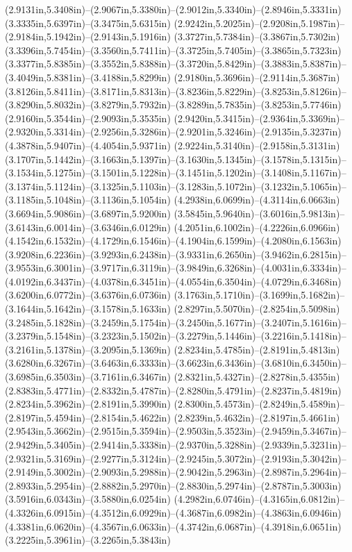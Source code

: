 (2.9131in,5.3408in)--(2.9067in,5.3380in)--(2.9012in,5.3340in)--(2.8946in,5.3331in) (3.3335in,5.6397in)--(3.3475in,5.6315in) (2.9242in,5.2025in)--(2.9208in,5.1987in)--(2.9184in,5.1942in)--(2.9143in,5.1916in) (3.3727in,5.7384in)--(3.3867in,5.7302in) (3.3396in,5.7454in)--(3.3560in,5.7411in)--(3.3725in,5.7405in)--(3.3865in,5.7323in) (3.3377in,5.8385in)--(3.3552in,5.8388in)--(3.3720in,5.8429in)--(3.3883in,5.8387in)--(3.4049in,5.8381in)--(3.4188in,5.8299in) (2.9180in,5.3696in)--(2.9114in,5.3687in) (3.8126in,5.8411in)--(3.8171in,5.8313in)--(3.8236in,5.8229in)--(3.8253in,5.8126in)--(3.8290in,5.8032in)--(3.8279in,5.7932in)--(3.8289in,5.7835in)--(3.8253in,5.7746in) (2.9160in,5.3544in)--(2.9093in,5.3535in) (2.9420in,5.3415in)--(2.9364in,5.3369in)--(2.9320in,5.3314in)--(2.9256in,5.3286in)--(2.9201in,5.3246in)--(2.9135in,5.3237in) (4.3878in,5.9407in)--(4.4054in,5.9371in) (2.9224in,5.3140in)--(2.9158in,5.3131in) (3.1707in,5.1442in)--(3.1663in,5.1397in)--(3.1630in,5.1345in)--(3.1578in,5.1315in)--(3.1534in,5.1275in)--(3.1501in,5.1228in)--(3.1451in,5.1202in)--(3.1408in,5.1167in)--(3.1374in,5.1124in)--(3.1325in,5.1103in)--(3.1283in,5.1072in)--(3.1232in,5.1065in)--(3.1185in,5.1048in)--(3.1136in,5.1054in) (4.2938in,6.0699in)--(4.3114in,6.0663in) (3.6694in,5.9086in)--(3.6897in,5.9200in) (3.5845in,5.9640in)--(3.6016in,5.9813in)--(3.6143in,6.0014in)--(3.6346in,6.0129in) (4.2051in,6.1002in)--(4.2226in,6.0966in) (4.1542in,6.1532in)--(4.1729in,6.1546in)--(4.1904in,6.1599in)--(4.2080in,6.1563in) (3.9208in,6.2236in)--(3.9293in,6.2438in)--(3.9331in,6.2650in)--(3.9462in,6.2815in)--(3.9553in,6.3001in)--(3.9717in,6.3119in)--(3.9849in,6.3268in)--(4.0031in,6.3334in)--(4.0192in,6.3437in)--(4.0378in,6.3451in)--(4.0554in,6.3504in)--(4.0729in,6.3468in) (3.6200in,6.0772in)--(3.6376in,6.0736in) (3.1763in,5.1710in)--(3.1699in,5.1682in)--(3.1644in,5.1642in)--(3.1578in,5.1633in) (2.8297in,5.5070in)--(2.8254in,5.5098in) (3.2485in,5.1828in)--(3.2459in,5.1754in)--(3.2450in,5.1677in)--(3.2407in,5.1616in)--(3.2379in,5.1548in)--(3.2323in,5.1502in)--(3.2279in,5.1446in)--(3.2216in,5.1418in)--(3.2161in,5.1378in)--(3.2095in,5.1369in) (2.8234in,5.4785in)--(2.8191in,5.4813in) (3.6280in,6.3267in)--(3.6463in,6.3333in)--(3.6623in,6.3436in)--(3.6810in,6.3450in)--(3.6985in,6.3503in)--(3.7161in,6.3467in) (2.8321in,5.4327in)--(2.8278in,5.4355in) (2.8383in,5.4771in)--(2.8332in,5.4787in)--(2.8280in,5.4791in)--(2.8237in,5.4819in) (2.8234in,5.3962in)--(2.8191in,5.3990in) (2.8300in,5.4573in)--(2.8249in,5.4589in)--(2.8197in,5.4594in)--(2.8154in,5.4622in) (2.8239in,5.4632in)--(2.8197in,5.4661in) (2.9543in,5.3662in)--(2.9515in,5.3594in)--(2.9503in,5.3523in)--(2.9459in,5.3467in)--(2.9429in,5.3405in)--(2.9414in,5.3338in)--(2.9370in,5.3288in)--(2.9339in,5.3231in)--(2.9321in,5.3169in)--(2.9277in,5.3124in)--(2.9245in,5.3072in)--(2.9193in,5.3042in)--(2.9149in,5.3002in)--(2.9093in,5.2988in)--(2.9042in,5.2963in)--(2.8987in,5.2964in)--(2.8933in,5.2954in)--(2.8882in,5.2970in)--(2.8830in,5.2974in)--(2.8787in,5.3003in) (3.5916in,6.0343in)--(3.5880in,6.0254in) (4.2982in,6.0746in)--(4.3165in,6.0812in)--(4.3326in,6.0915in)--(4.3512in,6.0929in)--(4.3687in,6.0982in)--(4.3863in,6.0946in) (4.3381in,6.0620in)--(4.3567in,6.0633in)--(4.3742in,6.0687in)--(4.3918in,6.0651in) (3.2225in,5.3961in)--(3.2265in,5.3843in) 